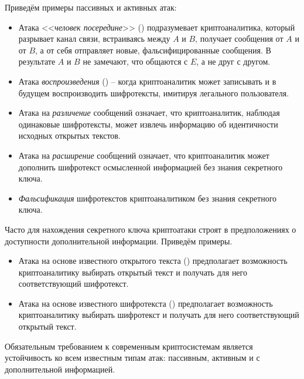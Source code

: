 Приведём примеры пассивных и активных атак:
\begin{itemize}
    \item Атака <<\emph{человек посередине}>> () подразумевает криптоаналитика, который разрывает канал связи, встраиваясь между $A$ и $B$, получает сообщения от $A$ и от $B$, а от себя отправляет новые, фальсифицированные сообщения. В результате $A$ и $B$ не замечают, что общаются с $E$, а не друг с другом.
    \item Атака \emph{воспроизведения} () -- когда криптоаналитик может записывать и в будущем воспроизводить шифротексты, имитируя легального пользователя.
    \item Атака на \emph{различение} сообщений означает, что криптоаналитик, наблюдая одинаковые шифротексты, может извлечь информацию об идентичности исходных открытых текстов.
    \item Атака на \emph{расширение} сообщений означает, что криптоаналитик может дополнить шифротекст осмысленной информацией без знания секретного ключа.
    \item \emph{Фальсификация} шифротекстов криптоаналитиком без знания секретного ключа.
\end{itemize}

Часто для нахождения секретного ключа криптоатаки строят в предположениях о доступности дополнительной информации. Приведём примеры.
\begin{itemize}
    \item Атака на основе известного открытого текста () предполагает возможность криптоаналитику выбирать открытый текст и получать для него соответствующий шифротекст.
    \item Атака на основе известного шифротекста () предполагает возможность криптоаналитику выбирать шифротекст и получать для него соответствующий открытый текст.
\end{itemize}

Обязательным требованием к современным криптосистемам является устойчивость ко всем известным типам атак: пассивным, активным и с дополнительной информацией.


%

